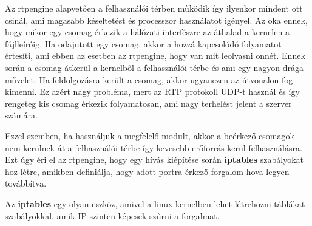 Az rtpengine alapvetően a felhasználói térben működik így ilyenkor mindent ott csinál, ami
magasabb késeltetést és processzor használatot igényel. Az oka ennek, hogy mikor egy csomag
érkezik a hálózati interfészre az áthalad a kernelen a fájlleíróig. Ha odajutott egy 
csomag, akkor a hozzá kapcsolódó folyamatot értesíti, ami ebben az esetben az rtpengine, hogy
van mit leolvasni onnét. Ennek során a csomag átkerül a kernelből a felhasználói térbe és 
ami egy nagyon drága művelet. Ha feldolgozásra került a csomag, akkor ugyanezen az útvonalon
fog kimenni. Ez azért nagy probléma, mert az RTP protokoll UDP-t használ és így rengeteg 
kis csomag érkezik folyamatosan, ami nagy terhelést jelent a szerver számára. 

Ezzel szemben, ha használjuk a megfelelő modult, akkor a beérkező csomagok nem kerülnek át a 
felhasználói térbe így kevesebb erőforrás kerül felhasználásra. Ezt úgy éri el az rtpengine,
hogy egy hívás kiépítése során \textbf{iptables} szabályokat hoz létre, amikben definiálja, hogy
adott portra érkező forgalom hova legyen továbbítva. 

Az \textbf{iptables} egy olyan eszköz, amivel a linux kernelben lehet létrehozni 
táblákat szabályokkal, amik IP szinten képesek szűrni a forgalmat. 


